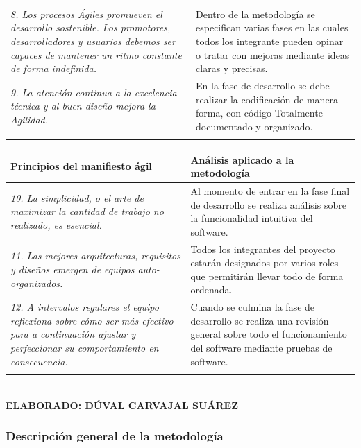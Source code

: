 \begin{table}[h!]
\begin{tabular}{p{7cm}p{7cm}}
		\addlinespace
		\textit{8. Los procesos Ágiles promueven el desarrollo sostenible. Los promotores, desarrolladores y usuarios debemos ser capaces de mantener un ritmo constante de forma indefinida.}  & Dentro de la metodología se especifican varias fases en las cuales todos los integrante pueden opinar o tratar con mejoras mediante ideas claras y precisas. \\
		\addlinespace
		\textit{9. La atención continua a la excelencia técnica y al buen diseño mejora la Agilidad.} & En la fase de desarrollo se debe realizar la codificación de manera forma, con código Totalmente documentado y organizado. \\
		\addlinespace
		\bottomrule
	\end{tabular}
	
\end{table}

\begin{table}
	\begin{tabular}{p{7cm}p{7cm}}
		\toprule
		\textbf{Principios del manifiesto ági}l & \textbf{Análisis aplicado a la metodología} \\
		\midrule
		\textit{10. La simplicidad, o el arte de maximizar la cantidad de trabajo no realizado, es esencial.} & Al momento de entrar en la fase final de desarrollo se realiza análisis sobre la funcionalidad intuitiva del software. \\
		\addlinespace
		\textit{11. Las mejores arquitecturas, requisitos y diseños emergen de equipos auto-organizados.} & Todos los integrantes del proyecto estarán designados por varios roles que permitirán llevar todo de forma ordenada. \\
		\addlinespace
		\textit{12. A intervalos regulares el equipo reflexiona sobre cómo ser más efectivo para a continuación ajustar y perfeccionar su comportamiento en consecuencia. } & Cuando se culmina la fase de desarrollo se realiza una revisión general sobre todo el funcionamiento del software mediante pruebas de software. \\
		\addlinespace
		\bottomrule
	\end{tabular}
	
	\textbf{ \\ ELABORADO: DÚVAL CARVAJAL SUÁREZ}
\end{table}

\subsubsection{Descripción general de la metodología}

